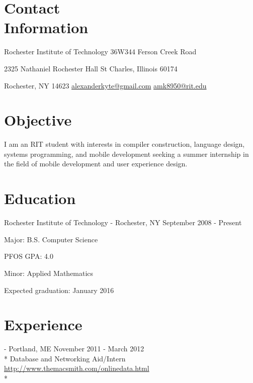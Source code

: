 \documentclass[letter,margin,line]{resume}
\newcommand{\rurl}[1]{\hfill {\footnotesize \url{#1}}}
\newcommand{\rdate}[1]{\hfill {\small #1}}
\renewcommand{\employer}[5]{\item[#1] - #2 \rdate{#3} \\* #4 \rurl{#5} \\*}
\begin{document}
\begin{resume}
\section{\mysidestyle Contact \\ Information} \vspace{2mm}
	\begin{asparablank}
		\item Rochester Institute of Technology \hfill 36W344 Ferson Creek Road
		\item 2325 Nathaniel Rochester Hall \hfill St Charles, Illinois 60174
		\item Rochester, NY 14623 \hfill
		\href{mailto:alexanderkyte@gmail.com}{alexanderkyte@gmail.com}
		\href{mailto:amk8950@rit.edu}{amk8950@rit.edu}
	\end{asparablank}

\section{\mysidestyle Objective} \vspace{2mm}
	\begin{asparablank}
		\small 
		I am an RIT student with interests in compiler construction, language design, systems programming, and mobile development seeking a summer internship in the field of mobile development and user experience design. 
	\end{asparablank}

\section{\mysidestyle Education}
	\begin{compactdesc}
		\item[Rochester Institute of Technology] - Rochester, NY \rdate{September 2008 - Present}
		\begin{compactitem} { \small
			\item Major: B.S. Computer Science
			\item PFOS GPA: 4.0
			\item Minor: Applied Mathematics
			\item Expected graduation: January 2016
		} \end{compactitem}
	\end{compactdesc}

\section{\mysidestyle Experience}
	\begin{asparadesc}
		\employer{MacSmith}{Portland, ME}{November 2011 - March 2012}{Database and Networking Aid/Intern}{http://www.themacsmith.com/onlinedata.html}


\end{asparadesc}
\end{resume}
\end{document}

